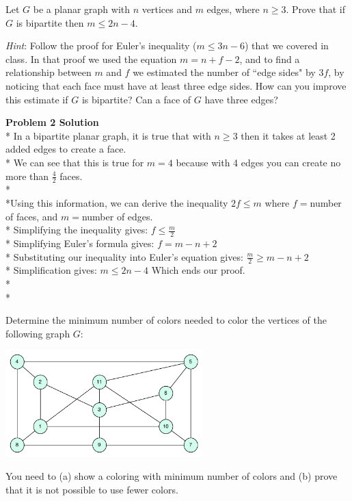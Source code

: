 \documentclass{article}
\begin{document}

\begin{problem}
Let $G$ be a planar graph with $n$ vertices and $m$ edges, where $n \ge 3$. 
Prove that if $G$ is bipartite then	$m \le 2n - 4$. 

\smallskip
\emph{Hint}: Follow the proof for Euler's inequality ($m \le 3n-6$) that 
	we covered in class. In that proof we used the equation 
$m = n + f - 2$, and to find a relationship between $m$ and $f$ we 
	estimated the number of ``edge sides" by $3f$, by noticing that
	each face must have at least three edge sides. How can you improve this
	estimate if $G$ is bipartite? Can a face of $G$ have three edges?
\end{problem}


\textbf{Problem 2 Solution}
\\*
In a bipartite planar graph, it is true that with $n \geq 3$ then it takes at least 2 added edges to create a face.
\\*
We can see that this is true for $m = 4$ because with 4 edges you can create no more than $\frac{4}{2}$ faces.
\\*
\\*Using this information, we can derive the inequality $2f \leq m$ where $f = $number of faces, and $m = $number of edges.
\\*
Simplifying the inequality gives: $f \leq \frac{m}{2}$
\\*
Simplifying Euler's formula gives: $f = m - n + 2$
\\*
Substituting our inequality into Euler's equation gives: $\frac{m}{2} \geq m - n + 2$
\\*
Simplification gives: $m \leq 2n - 4$ Which ends our proof.
\\*\\*

\begin{problem}
Determine the minimum number of colors needed to color
the vertices of the following graph $G$:

\begin{center}
\includegraphics[width = 3in]{color_graph_hw5.pdf}
\end{center}

You need to (a) show a coloring with minimum number
of colors and (b) prove that it is not possible to
use fewer colors.
\end{problem}
\end{document}
